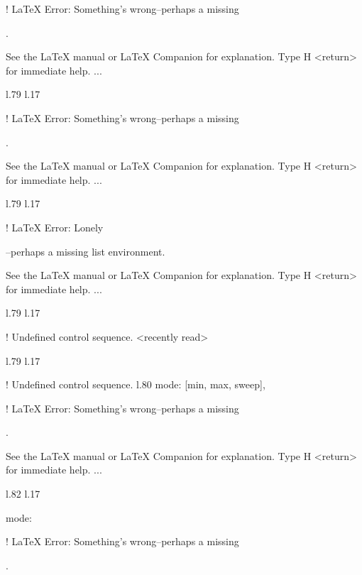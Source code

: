 {{{{{{{{{{{{{{{{{! LaTeX Error: Something's wrong--perhaps a missing \item.

See the LaTeX manual or LaTeX Companion for explanation.
Type  H <return>  for immediate help.
 ...                                              
                                                  
l.79 l.17     \item \xmlNode
                            

! LaTeX Error: Something's wrong--perhaps a missing \item.

See the LaTeX manual or LaTeX Companion for explanation.
Type  H <return>  for immediate help.
 ...                                              
                                                  
l.79 l.17     \item \xmlNode
                            

! LaTeX Error: Lonely \item--perhaps a missing list environment.

See the LaTeX manual or LaTeX Companion for explanation.
Type  H <return>  for immediate help.
 ...                                              
                                                  
l.79 l.17     \item \xmlNode
                            
! Undefined control sequence.
<recently read> \xmlNode 
                         
l.79 l.17     \item \xmlNode
                            
! Undefined control sequence.
l.80                        {mode}: \xmlDesc
                                            {[min, max, sweep]},

! LaTeX Error: Something's wrong--perhaps a missing \item.

See the LaTeX manual or LaTeX Companion for explanation.
Type  H <return>  for immediate help.
 ...                                              
                                                  
l.82 l.17     \item \xmlNode
                            {mode}: \xmlDesc

! LaTeX Error: Something's wrong--perhaps a missing \item.

}}}}}}}}}}}}}}}}}
